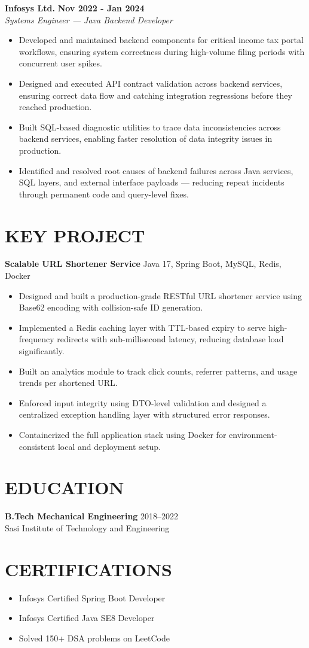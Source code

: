 \documentclass[a4paper,10pt]{article}
\begin{document}
\textbf{Infosys Ltd.} \hfill \textbf{Nov 2022 - Jan 2024} \\
\textit{Systems Engineer --- Java Backend Developer}
\begin{itemize}[leftmargin=*,noitemsep]
    \item Developed and maintained backend components for critical income tax portal workflows, ensuring system correctness during high-volume filing periods with concurrent user spikes.
    \item Designed and executed API contract validation across backend services, ensuring correct data flow and catching integration regressions before they reached production.
    \item Built SQL-based diagnostic utilities to trace data inconsistencies across backend services, enabling faster resolution of data integrity issues in production.
    \item Identified and resolved root causes of backend failures across Java services, SQL layers, and external interface payloads --- reducing repeat incidents through permanent code and query-level fixes.
\end{itemize}

\section*{KEY PROJECT}
\textbf{Scalable URL Shortener Service} \hfill Java 17, Spring Boot, MySQL, Redis, Docker
\begin{itemize}[leftmargin=*,noitemsep]
    \item Designed and built a production-grade RESTful URL shortener service using Base62 encoding with collision-safe ID generation.
    \item Implemented a Redis caching layer with TTL-based expiry to serve high-frequency redirects with sub-millisecond latency, reducing database load significantly.
    \item Built an analytics module to track click counts, referrer patterns, and usage trends per shortened URL.
    \item Enforced input integrity using DTO-level validation and designed a centralized exception handling layer with structured error responses.
    \item Containerized the full application stack using Docker for environment-consistent local and deployment setup.
\end{itemize}

\section*{EDUCATION}
\textbf{B.Tech Mechanical Engineering} \hfill 2018--2022 \\
Sasi Institute of Technology and Engineering

\section*{CERTIFICATIONS}
\begin{itemize}[leftmargin=*,noitemsep]
    \item Infosys Certified Spring Boot Developer
    \item Infosys Certified Java SE8 Developer
    \item Solved 150+ DSA problems on LeetCode
\end{itemize}
\end{document}
